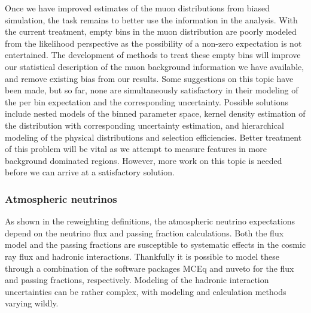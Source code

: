 Once we have improved estimates of the muon distributions from biased simulation, the task remains to better use the information in the analysis.
With the current treatment, empty bins in the muon distribution are poorly modeled from the likelihood perspective as the possibility of a non-zero expectation is not entertained.
The development of methods to treat these empty bins will improve our statistical description of the muon background information we have available, and remove existing bias from our results.
Some suggestions on this topic have been made, but so far, none are simultaneously satisfactory in their modeling of the per bin expectation and the corresponding uncertainty.
Possible solutions include nested models of the binned parameter space, kernel density estimation of the distribution with corresponding uncertainty estimation, and hierarchical modeling of the physical distributions and selection efficiencies.
Better treatment of this problem will be vital as we attempt to measure features in more background dominated regions.
However, more work on this topic is needed before we can arrive at a satisfactory solution.

\subsubsection{Atmospheric neutrinos}
As shown in the reweighting definitions, the atmospheric neutrino expectations depend on the neutrino flux and passing fraction calculations.
Both the flux model and the passing fractions are susceptible to systematic effects in the cosmic ray flux and hadronic interactions.
Thankfully it is possible to model these through a combination of the software packages MCEq and nuveto for the flux and passing fractions, respectively.
Modeling of the hadronic interaction uncertainties can be rather complex, with modeling and calculation methods varying wildly.

